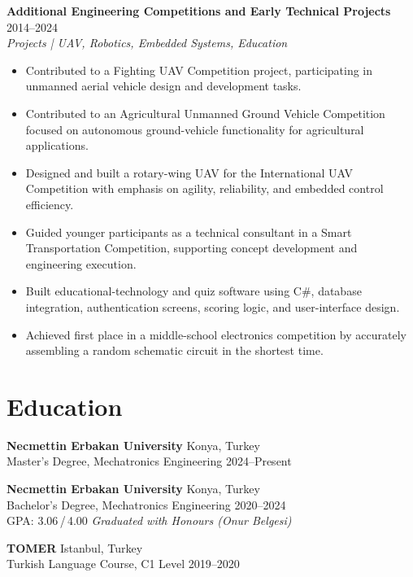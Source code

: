 \documentclass[a4paper,10pt]{article}
\begin{document}
\vspace{3pt}
\textbf{Additional Engineering Competitions and Early Technical Projects} \hfill 2014--2024\\
\textit{Projects | UAV, Robotics, Embedded Systems, Education}
\begin{itemize}
  \item Contributed to a Fighting UAV Competition project, participating in unmanned aerial
        vehicle design and development tasks.
  \item Contributed to an Agricultural Unmanned Ground Vehicle Competition focused on
        autonomous ground-vehicle functionality for agricultural applications.
  \item Designed and built a rotary-wing UAV for the International UAV Competition with
        emphasis on agility, reliability, and embedded control efficiency.
  \item Guided younger participants as a technical consultant in a Smart Transportation
        Competition, supporting concept development and engineering execution.
  \item Built educational-technology and quiz software using C\#, database integration,
        authentication screens, scoring logic, and user-interface design.
  \item Achieved first place in a middle-school electronics competition by accurately
        assembling a random schematic circuit in the shortest time.
\end{itemize}

\section*{Education}

\textbf{Necmettin Erbakan University} \hfill Konya, Turkey\\
Master's Degree, Mechatronics Engineering \hfill 2024--Present

\vspace{4pt}
\textbf{Necmettin Erbakan University} \hfill Konya, Turkey\\
Bachelor's Degree, Mechatronics Engineering \hfill 2020--2024\\
GPA: 3.06\,/\,4.00 \quad \textit{Graduated with Honours (Onur Belgesi)}

\vspace{4pt}
\textbf{TOMER} \hfill Istanbul, Turkey\\
Turkish Language Course, C1 Level \hfill 2019--2020
\end{document}
